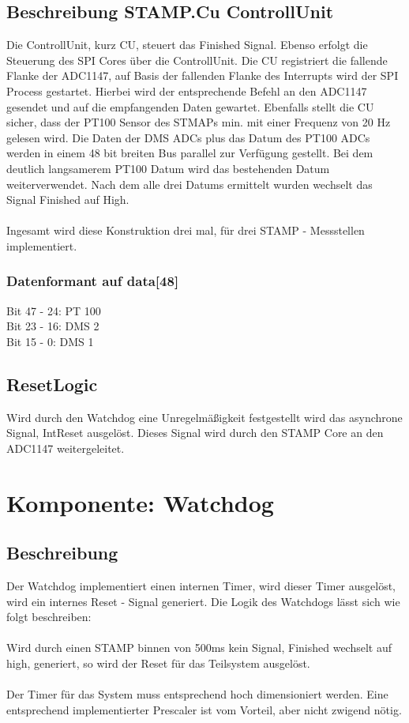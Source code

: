 \documentclass{scrreprt}
\begin{document}
\subsection{Beschreibung STAMP.Cu ControllUnit} 
Die ControllUnit, kurz CU, steuert das Finished Signal. Ebenso erfolgt die Steuerung des SPI Cores über die ControllUnit.  Die CU registriert die fallende Flanke der ADC1147, auf Basis der fallenden Flanke des Interrupts wird der SPI Process gestartet. Hierbei wird der entsprechende Befehl an den ADC1147 gesendet und auf die empfangenden Daten gewartet. Ebenfalls stellt die CU sicher, dass der PT100 Sensor des STMAPs min. mit einer Frequenz von 20 Hz gelesen wird. Die Daten der DMS ADCs plus das Datum des PT100 ADCs werden in einem 48 bit breiten Bus parallel zur Verfügung gestellt. Bei dem deutlich langsamerem PT100 Datum wird das bestehenden Datum weiterverwendet. Nach dem alle drei Datums ermittelt wurden wechselt das Signal Finished auf High. \\\\
Ingesamt wird diese Konstruktion drei mal, für drei STAMP - Messstellen implementiert. 
\subsubsection{Datenformant auf data[48]}
Bit 47 - 24: PT 100 \\
Bit 23 - 16: DMS 2 \\
Bit 15 - 0: DMS 1 
\subsection{ResetLogic}
Wird durch den Watchdog eine Unregelmäßigkeit festgestellt wird das asynchrone Signal, IntReset ausgelöst. Dieses Signal wird durch den STAMP Core an den ADC1147 weitergeleitet. 
\section{Komponente: Watchdog}
\subsection{Beschreibung}
Der Watchdog implementiert einen internen Timer, wird dieser Timer ausgelöst, wird ein internes Reset - Signal generiert. Die Logik des Watchdogs lässt sich wie folgt beschreiben: \\\\
Wird durch einen STAMP binnen von 500ms kein Signal, Finished wechselt auf high, generiert, so wird der Reset für das Teilsystem ausgelöst. 
\\\\
Der Timer für das System muss entsprechend hoch dimensioniert werden. Eine entsprechend implementierter Prescaler ist vom Vorteil, aber nicht zwigend nötig.
\end{document}
